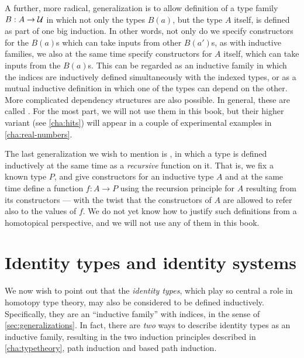 %
%
A further, more radical, generalization is to allow definition of a type family $B:A\to \mathcal{U}$ in which not only the types $B(a)$, but the type $A$ itself, is defined as part of one big induction.
In other words, not only do we specify constructors for the $B(a)$s which can take inputs from other $B(a')$s, as with inductive families, we also at the same time specify constructors for $A$ itself, which can take inputs from the $B(a)$s.
This can be regarded as an inductive family in which the indices are inductively defined simultaneously with the indexed types, or as a mutual inductive definition in which one of the types can depend on the other.
More complicated dependency structures are also possible.
In general, these are called .
For the most part, we will not use them in this book, but their higher variant (see \cref{cha:hits}) will appear in a couple of experimental examples in \cref{cha:real-numbers}.

%
%
The last generalization we wish to mention is , in which a type is defined inductively at the same time as a \emph{recursive} function on it.
That is, we fix a known type $P$, and give constructors for an inductive type $A$ and at the same time define a function $f:A\to P$ using the recursion principle for $A$ resulting from its constructors --- with the twist that the constructors of $A$ are allowed to refer also to the values of $f$.
We do not yet know how to justify such definitions from a homotopical perspective, and we will not use any of them in this book.

%

\section{Identity types and identity systems}
\label{sec:identity-systems}

%
We now wish to point out that the \emph{identity types}, which play so central a role in homotopy type theory, may also be considered to be defined inductively.
Specifically, they are an ``inductive family'' with indices, in the sense of \cref{sec:generalizations}.
In fact, there are \emph{two} ways to describe identity types as an
inductive family, resulting in the two induction principles described in
\cref{cha:typetheory}, path induction and based path induction.

